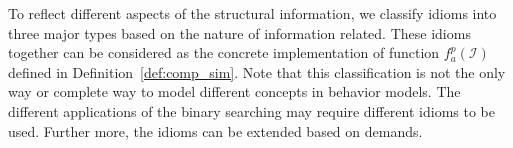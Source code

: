 To reflect different aspects of the structural information,
we classify idioms into three major types based on the nature of information related. These idioms together can be considered as the concrete implementation of function $f^{p}_{a}(\mathcal{I})$ defined in Definition~\ref{def:comp_sim}.
Note that this classification is not the only way or complete way to model different concepts in behavior models.
The different applications of the binary searching may require different idioms to be used.
Further more, the idioms can be extended based on demands.


